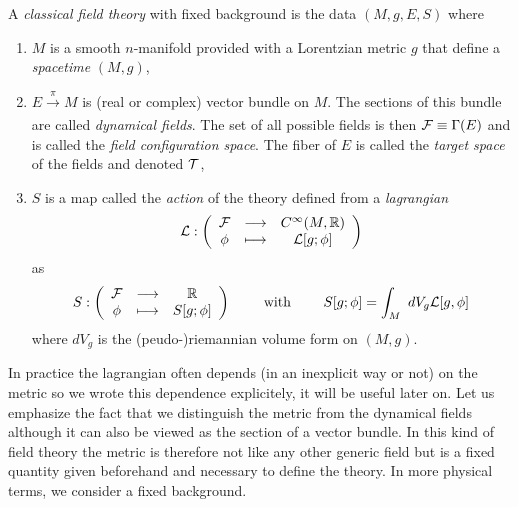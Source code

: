 \documentclass[a4paper,10pt]{article}
\begin{document}
        A \emph{classical field theory} with fixed background is the data $(M,g,E,S)$ where
        \begin{enumerate}
            \item $M$ is a smooth $n$-manifold provided with a Lorentzian metric $g$ that define a \emph{spacetime} $(M,g)$,
            \item $E\xrightarrow[]{\pi}M$ is (real or complex) vector bundle on $M$. The sections of this bundle are called \emph{dynamical fields}. The set of all possible fields is then $\mathcal{F}\equiv\Gamma(E)$ and is called the \emph{field configuration space}. The fiber of $E$ is called the \emph{target space} of the fields and denoted $\mathcal{T}$,
            \item $S$ is a map called the \emph{action} of the theory defined from a \emph{lagrangian}
            \begin{equation}
                \mathcal{L}:\left(
                \begin{array}{ccc}
                    \mathcal{F} & \longrightarrow & C^\infty(M,\mathbb{R}) \\
                    \phi & \longmapsto & \mathcal{L}[g;\phi]
                \end{array}
                \right)
            \end{equation}
            as
            \begin{equation}
                S:\left(
                \begin{array}{ccc}
                    \mathcal{F} & \longrightarrow & \mathbb{R} \\
                    \phi & \longmapsto & S[g;\phi]
                \end{array}
                \right)\qquad\text{ with }\qquad S[g;\phi]=\int_M~dV_g\mathcal{L}[g,\phi]
            \end{equation}
            where $dV_g$ is the (peudo-)riemannian volume form on $(M,g)$.
        \end{enumerate}
        In practice the lagrangian often depends (in an inexplicit way or not) on the metric so we wrote this dependence explicitely, it will be useful later on. Let us emphasize the fact that we distinguish the metric from the dynamical fields although it can also be viewed as the section of a vector bundle. In this kind of field theory the metric is therefore not like any other generic field but is a fixed quantity given beforehand and necessary to define the theory. In more physical terms, we consider a fixed background.
\end{document}

